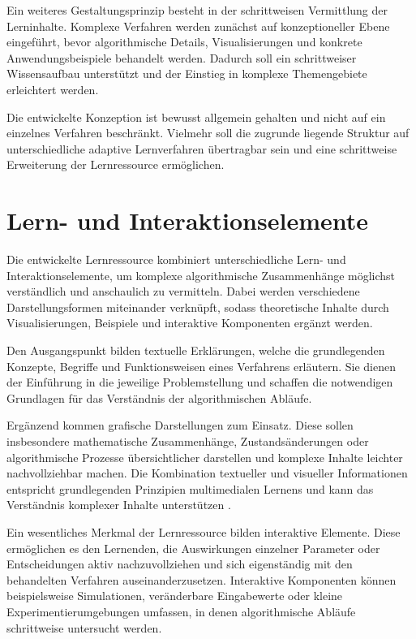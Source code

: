 Ein weiteres Gestaltungsprinzip besteht in der schrittweisen Vermittlung
der Lerninhalte. Komplexe Verfahren werden zunächst auf konzeptioneller
Ebene eingeführt, bevor algorithmische Details, Visualisierungen und
konkrete Anwendungsbeispiele behandelt werden. Dadurch soll ein
schrittweiser Wissensaufbau unterstützt und der Einstieg in komplexe
Themengebiete erleichtert werden.

Die entwickelte Konzeption ist bewusst allgemein gehalten und nicht auf
ein einzelnes Verfahren beschränkt. Vielmehr soll die zugrunde liegende
Struktur auf unterschiedliche adaptive Lernverfahren übertragbar sein
und eine schrittweise Erweiterung der Lernressource ermöglichen.

\section{Lern- und
Interaktionselemente}\label{lern--und-interaktionselemente}

Die entwickelte Lernressource kombiniert unterschiedliche Lern- und
Interaktionselemente, um komplexe algorithmische Zusammenhänge möglichst
verständlich und anschaulich zu vermitteln. Dabei werden verschiedene
Darstellungsformen miteinander verknüpft, sodass theoretische Inhalte
durch Visualisierungen, Beispiele und interaktive Komponenten ergänzt
werden.

Den Ausgangspunkt bilden textuelle Erklärungen, welche die grundlegenden
Konzepte, Begriffe und Funktionsweisen eines Verfahrens erläutern. Sie
dienen der Einführung in die jeweilige Problemstellung und schaffen die
notwendigen Grundlagen für das Verständnis der algorithmischen Abläufe.

Ergänzend kommen grafische Darstellungen zum Einsatz. Diese sollen
insbesondere mathematische Zusammenhänge, Zustandsänderungen oder
algorithmische Prozesse übersichtlicher darstellen und komplexe Inhalte
leichter nachvollziehbar machen. Die Kombination textueller und
visueller Informationen entspricht grundlegenden Prinzipien
multimedialen Lernens und kann das Verständnis komplexer Inhalte
unterstützen \citep{Mayer2005}.

Ein wesentliches Merkmal der Lernressource bilden interaktive Elemente.
Diese ermöglichen es den Lernenden, die Auswirkungen einzelner Parameter
oder Entscheidungen aktiv nachzuvollziehen und sich eigenständig mit den
behandelten Verfahren auseinanderzusetzen. Interaktive Komponenten
können beispielsweise Simulationen, veränderbare Eingabewerte oder
kleine Experimentierumgebungen umfassen, in denen algorithmische Abläufe
schrittweise untersucht werden.

